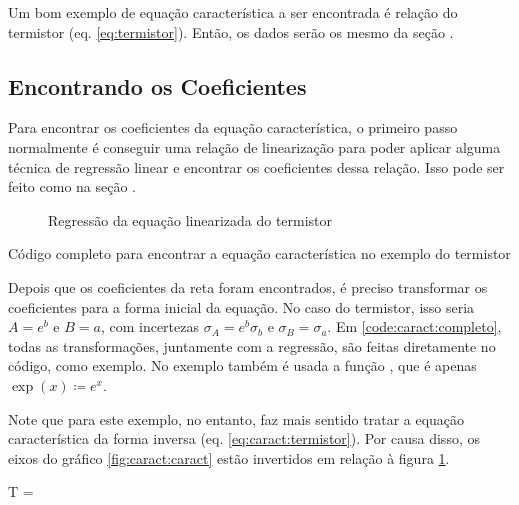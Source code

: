 Um bom exemplo de equação característica a ser encontrada é relação do termistor (eq. \ref{eq:termistor}). Então, os dados serão os mesmo da seção .


\subsection{Encontrando os Coeficientes}

    Para encontrar os coeficientes da equação característica, o primeiro passo normalmente é conseguir uma relação de linearização para poder aplicar alguma técnica de regressão linear e encontrar os coeficientes dessa relação. Isso pode ser feito como na seção .

    \begin{figure}[H]
        \centering
        

        \caption{Regressão da equação linearizada do termistor}
        \label{fig:caract:regres}
    \end{figure}

    \begin{listing}[H]
        \caption{Código completo para encontrar a equação característica no exemplo do termistor}
        \label{code:caract:completo}

    \end{listing}

    Depois que os coeficientes da reta foram encontrados, é preciso transformar os coeficientes para a forma inicial da equação. No caso do termistor, isso seria $A = e^b$ e $B = a$, com incertezas $\sigma_A = e^b \sigma_b$ e $\sigma_B = \sigma_a$. Em \ref{code:caract:completo}, todas as transformações, juntamente com a regressão, são feitas diretamente no código, como exemplo. No exemplo também é usada a função , que é apenas $\exp(x) \coloneqq e^x$.

    Note que para este exemplo, no entanto, faz mais sentido tratar a equação característica da forma inversa (eq. \ref{eq:caract:termistor}). Por causa disso, os eixos do gráfico \ref{fig:caract:caract} estão invertidos em relação à figura \ref{fig:caract:regres}.

    \begin{equacao} \label{eq:caract:termistor}
        T = 
    \end{equacao}


